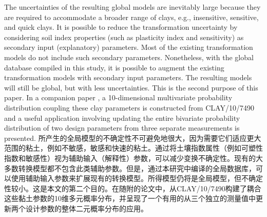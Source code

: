 \begin{Parallel}{0.60\textwidth}{}
{    }
    \ParallelPar
    
    \ParallelLText
    {
        The uncertainties of the resulting global models are inevitably large because they are required to accommodate a broader range of clays, e.g., insensitive, sensitive, and quick clays. It is possible to reduce the transformation uncertainty by considering soil index properties (such as plasticity index and sensitivity) as secondary input (explanatory) parameters. Most of the existing transformation models do not include such secondary parameters. Nonetheless, with the global database compiled in this study, it is possible to augment the existing transformation models with secondary input parameters. The resulting models will still be global, but with less uncertainties. This is the second purpose of this paper. In a companion paper \citep{Ching2014686}, a 10-dimensional multivariate probability distribution coupling these clay parameters is constructed from CLAY/10/7490 and a useful application involving updating the entire bivariate probability distribution of two design parameters from three separate measurements is presented.
    }
    \ParallelRText
    {
        所产生的全局模型的不确定性不可避免地很大，因为需要它们适应更大范围的粘土，例如不敏感，敏感和快速的粘土。通过将土壤指数属性（例如可塑性指数和敏感性）视为辅助输入（解释性）参数，可以减少变换不确定性。现有的大多数转换模型都不包含此类辅助参数。但是，通过本研究中编译的全局数据库，可以使用辅助输入参数来扩展现有的转换模型。所得模型仍将是全局模型，但不确定性较小。这是本文的第二个目的。在随附的论文中\citep{Ching2014686}，从CLAY/10/7490构建了耦合这些黏土参数的10维多元概率分布，并呈现了一个有用的从三个独立的测量值中更新两个设计参数的整体二元概率分布的应用。
    }
\end{Parallel}